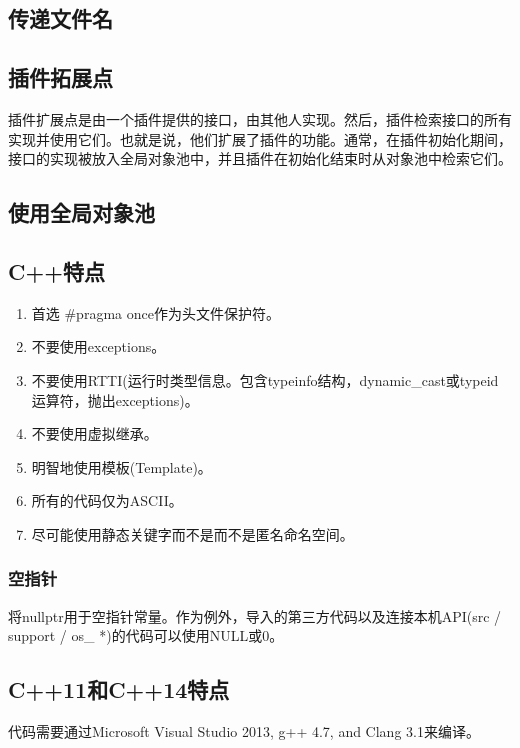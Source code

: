 \subsection{传递文件名}
\subsection{插件拓展点}
插件扩展点是由一个插件提供的接口，由其他人实现。然后，插件检索接口的所有实现并使用它们。也就是说，他们扩展了插件的功能。通常，在插件初始化期间，接口的实现被放入全局对象池中，并且插件在初始化结束时从对象池中检索它们。
\subsection{使用全局对象池}
\subsection{C++特点}
\begin{enumerate}
	\item 首选 \#pragma once作为头文件保护符。
	\item 不要使用exceptions。
	\item 不要使用RTTI(运行时类型信息。包含typeinfo结构，dynamic\_cast或typeid运算符，抛出exceptions)。
	\item 不要使用虚拟继承。
	\item 明智地使用模板(Template)。
	\item 所有的代码仅为ASCII。
	\item 尽可能使用静态关键字而不是而不是匿名命名空间。
\end{enumerate}
\subsubsection{空指针}
将nullptr用于空指针常量。作为例外，导入的第三方代码以及连接本机API(src / support / os\_ *)的代码可以使用NULL或0。
\subsection{C++11和C++14特点}
代码需要通过Microsoft Visual Studio 2013, g++ 4.7, and Clang 3.1来编译。
